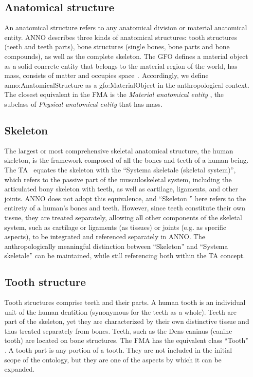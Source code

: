 \documentclass[sw]{iosart2x}
\begin{document}
\subsection{Anatomical structure}
An anatomical structure refers to any anatomical division or material anatomical entity.
ANNO describes three kinds of anatomical structures: tooth structures (teeth and teeth parts), bone structures (single bones, bone parts and bone compounds), as well as the complete skeleton.
The GFO defines a material object  as a solid concrete entity that belongs to the material region of the world, has mass, consists of matter and occupies space~\citep{gfospace}.
Accordingly, we define anno:AnatomicalStructure as a gfo:MaterialObject in the anthropological context.
The closest equivalent in the FMA is the \emph{Material anatomical entity} , the subclass of \emph{Physical anatomical entity}  that has mass.

\subsection{Skeleton}
The largest or most comprehensive skeletal anatomical structure, the human skeleton, is the framework composed of all the bones and teeth of a human being.
The TA~\citep{ta2} equates the skeleton with the \enquote{Systema skeletale (skeletal system)}, which refers to the passive part of the musculoskeletal system, including the articulated bony skeleton with teeth, as well as cartilage, ligaments, and other joints.
ANNO does not adopt this equivalence, and \enquote{Skeleton } here refers to the entirety of a human's bones and teeth.
However, since teeth constitute their own tissue, they are treated separately, allowing all other components of the skeletal system, such as cartilage or ligaments (as tissues) or joints (e.g. as specific aspects), to be integrated and referenced separately in ANNO.
The anthropologically meaningful distinction between \enquote{Skeleton} and \enquote{Systema skeletale} can be maintained, while still referencing both within the TA concept.

\subsection{Tooth structure}
Tooth structures comprise teeth and their parts.
A human tooth is an individual unit of the human dentition (synonymous for the teeth as a whole).
Teeth are part of the skeleton, yet they are characterized by their own distinctive tissue and thus treated separately from bones.
Teeth, such as the Dens caninus (canine tooth) are located on bone structures.
The FMA has the equivalent class \enquote{Tooth} .
A tooth part is any portion of a tooth.
They are not included in the initial scope of the ontology, but they are one of the aspects by which it can be expanded.
\end{document}
